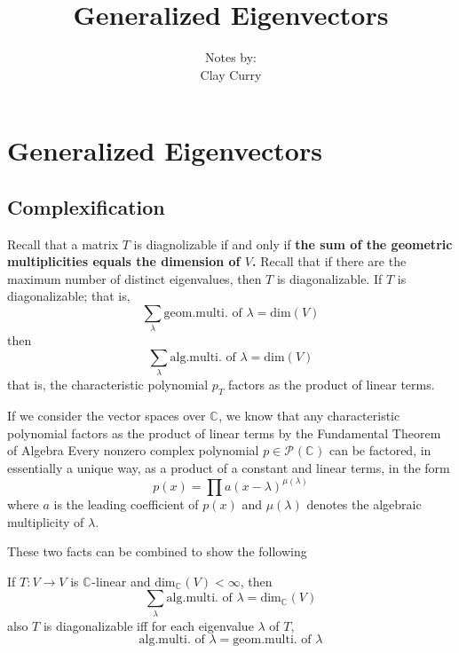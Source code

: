\documentclass[11pt]{article} %
\title{Generalized Eigenvectors}
\author{Notes by:  \\ Clay Curry}
\date{}
\newcommand\C[1]{\text{$\mathbb{C^{#1}}$}}
\newcommand\V{\text{$V$}}
\newcommand\0{\text{$\mathbf{0}$}}
\newcommand\poly[1]{\mathcal{P}_{#1}(\C{})}
\renewcommand\dim{\text{dim}}
\begin{document}
\section{Generalized Eigenvectors}
\subsection{Complexification}
Recall that a matrix $T$ is diagnolizable if and only if \textbf{the sum of the geometric multiplicities equals the dimension of $\V$.}
Recall that if there are the maximum number of distinct eigenvalues, then $T$ is diagonalizable.
{If $T$ is diagonalizable; that is,
$$
\sum_\lambda \text{geom.multi. of }\lambda = \dim(\V)
$$
then
$$
\sum_\lambda \text{alg.multi. of }\lambda = \dim(\V)
$$
that is, the characteristic polynomial $p_T$ factors as the product of linear terms.
}{}

If we consider the vector spaces over $\C{}$, we know that any characteristic polynomial factors as the product of linear terms by the Fundamental Theorem of Algebra
{Every nonzero complex polynomial $p \in \poly{}$ can be factored, in essentially a unique way, as a product of a constant and linear terms, in the form
$$
p(x)=\prod a(x-\lambda)^{\mu(\lambda)}
$$
where $a$ is the leading coefficient of $p(x)$ and $\mu(\lambda)$ denotes the algebraic multiplicity of $\lambda$.}{}

These two facts can be combined to show the following
{If $T: \V \to \V$ is $\C{}$-linear and $\dim_\C{}(\V) < \infty$, then
$$
\sum_\lambda \text{alg.multi. of }\lambda = \dim_\C{}(\V)
$$
also $T$ is diagonalizable iff for each eigenvalue $\lambda$ of $T$,
$$
\text{alg.multi. of }\lambda = \text{geom.multi. of }\lambda
$$

}{}
\end{document}
